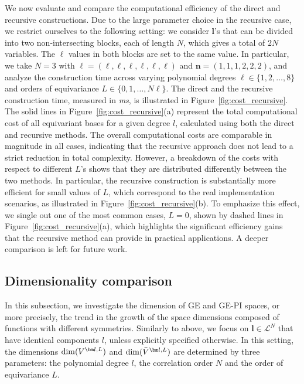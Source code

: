 \documentclass{article}
\newcommand{\bV}{{\bar V}}
\newcommand{\dimge}[2]{\dim(V^{#1,#2})}
\newcommand{\dimpi}[2]{\dim(\bV^{#1,#2})}
\numberwithin{equation}{section}
\def\bl{{\bm l}}
\def\bn{{\bm n}}
\def\calL{\mathcal{L}}
\def\dim{{{\rm dim}}}
\begin{document}
We now evaluate and compare the computational efficiency of the direct and recursive constructions. Due to the large parameter choice in the recursive case, we restrict ourselves to the following setting: we consider $\bl$'s that can be divided into two non-intersecting blocks, each of length $N$, which gives a total of $2N$ variables. The $\ell$ values in both blocks are set to the same value. In particular, we take $N = 3$ with $\boldsymbol{\ell} = (\ell,\ell,\ell,\ell,\ell,\ell)$ and $\bn = (1,1,1,2,2,2)$, and analyze the construction time across varying polynomial degrees $\ell\in\{1,2,\ldots,8\}$ and orders of equivariance $L\in\{0,1,\ldots,N\ell\}$. The direct and the recursive construction time, measured in \emph{ms}, is illustrated in Figure~\ref{fig:cost_recursive}.
The solid lines in Figure~\ref{fig:cost_recursive}(a) represent the total computational cost of all equivariant bases for a given degree $l$, calculated using both the direct and recursive methods. The overall computational costs are comparable in magnitude in all cases, indicating that the recursive approach does not lead to a strict reduction in total complexity. However, a breakdown of the costs with respect to different $L$'s shows that they are distributed differently between the two methods. In particular, the recursive construction is substantially more efficient for small values of $L$, which correspond to the real implementation scenarios, as illustrated in Figure~\ref{fig:cost_recursive}(b). To emphasize this effect, we single out one of the most common cases, $L=0$, shown by dashed lines in Figure~\ref{fig:cost_recursive}(a), which highlights the significant efficiency gains that the recursive method can provide in practical applications.
A deeper comparison is left for future work.







\subsection{Dimensionality comparison}\label{sec:dimensionalities}
In this subsection, we investigate the dimension of GE and GE-PI spaces, or more precisely, 
the trend in the growth of the space dimensions composed of functions with different symmetries. 
Similarly to above, we focus on $\bl\in\calL^N$ that have identical components $l$, unless explicitly specified otherwise. In this setting, the dimensions $\dimge{\bl}{L}$ and $\dimpi{\bl}{L}$ are determined by three parameters: the polynomial degree $l$, the correlation order $N$ and the order of equivariance $L$. 
\end{document}
